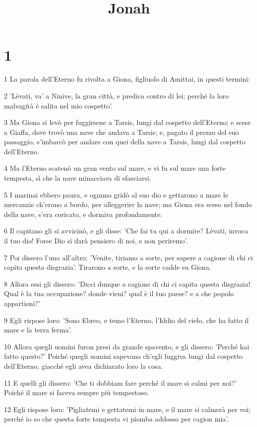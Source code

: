 

\title{Jonah}


\chapter{1}

\par 1 La parola dell'Eterno fu rivolta a Giona, figliuolo di Amittai, in questi termini:
\par 2 'Lèvati, va' a Ninive, la gran città, e predica contro di lei; perché la loro malvagità è salita nel mio cospetto'.
\par 3 Ma Giona si levò per fuggirsene a Tarsis, lungi dal cospetto dell'Eterno; e scese a Giaffa, dove trovò una nave che andava a Tarsis; e, pagato il prezzo del suo passaggio, s'imbarcò per andare con quei della nave a Tarsis, lungi dal cospetto dell'Eterno.
\par 4 Ma l'Eterno scatenò un gran vento sul mare, e vi fu sul mare una forte tempesta, sì che la nave minacciava di sfasciarsi.
\par 5 I marinai ebbero paura, e ognuno gridò al suo dio e gettarono a mare le mercanzie ch'erano a bordo, per alleggerire la nave; ma Giona era sceso nel fondo della nave, s'era coricato, e dormiva profondamente.
\par 6 Il capitano gli si avvicinò, e gli disse: 'Che fai tu qui a dormire? Lèvati, invoca il tuo dio! Forse Dio si darà pensiero di noi, e non periremo'.
\par 7 Poi dissero l'uno all'altro: 'Venite, tiriamo a sorte, per sapere a cagione di chi ci capita questa disgrazia'. Tirarono a sorte, e la sorte cadde su Giona.
\par 8 Allora essi gli dissero: 'Dicci dunque a cagione di chi ci capita questa disgrazia! Qual è la tua occupazione? donde vieni? qual è il tuo paese? e a che popolo appartieni?'
\par 9 Egli rispose loro: 'Sono Ebreo, e temo l'Eterno, l'Iddio del cielo, che ha fatto il mare e la terra ferma'.
\par 10 Allora quegli uomini furon presi da grande spavento, e gli dissero: 'Perché hai fatto questo?' Poiché quegli uomini sapevano ch'egli fuggiva lungi dal cospetto dell'Eterno, giacché egli avea dichiarato loro la cosa.
\par 11 E quelli gli dissero: 'Che ti dobbiam fare perché il mare si calmi per noi?' Poiché il mare si faceva sempre più tempestoso.
\par 12 Egli rispose loro: 'Pigliatemi e gettatemi in mare, e il mare si calmerà per voi; perché io so che questa forte tempesta vi piomba addosso per cagion mia'.
